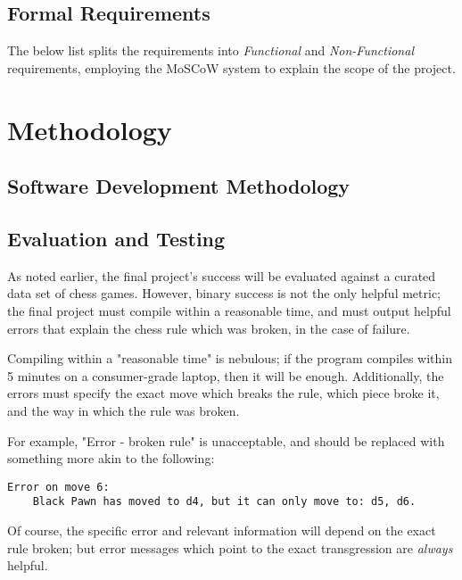 \documentclass[12pt, a4paper]{scrartcl}
\begin{document}

\subsection{Formal Requirements}

The below list splits the requirements into \emph{Functional} and \emph{Non-Functional} requirements, employing the MoSCoW system to explain the scope of the project.


\section{Methodology}


\subsection{Software Development Methodology}

\subsection{Evaluation and Testing}

As noted earlier, the final project's success will be evaluated against a curated data set of chess games. However, binary success is not the only helpful metric; the final project must compile within a reasonable time, and must output helpful errors that explain the chess rule which was broken, in the case of failure.

Compiling within a "reasonable time" is nebulous; if the program compiles within 5 minutes on a consumer-grade laptop, then it will be enough. Additionally, the errors must specify the exact move which breaks the rule, which piece broke it, and the way in which the rule was broken.

For example, "Error - broken rule" is unacceptable, and should be replaced with something more akin to the following:

\begin{lstlisting}
Error on move 6:
    Black Pawn has moved to d4, but it can only move to: d5, d6.
\end{lstlisting}

Of course, the specific error and relevant information will depend on the exact rule broken; but error messages which point to the exact transgression are \emph{always} helpful.
\end{document}
